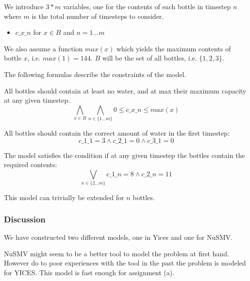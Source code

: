 \documentclass[12pt]{article}
\begin{document}
We introduce $3*m$ variables, one for the contents of each bottle in timestep 
$n$ where $m$ is the total number of timesteps to consider.

\begin{itemize}
\item $c\_x\_n$ for $x \in B$ and $n = 1 \ldots m$
\end{itemize}

We also assume a function $max(x)$ which yields the maximum contents of bottle
$x$, i.e. $max(1) = 144$. $B$ will be the set of all bottles, i.e. $\{1,2,3\}$.

The following formulas describe the constraints of the model.

\vspace{3mm}

All bottles should contain at least no water, and at max their maximum capacity
at any given timestep.
\begin{equation}
	\bigwedge_{x \in B} \bigwedge_{n \in \{1\ldots m\}} 
							0 \leq c\_x\_n \leq max(x)
\end{equation}
 
\vspace{3mm}

All bottles should contain the correct amount of water in the first timestep:
\begin{equation}
	c\_1\_1 = 3 \wedge c\_2\_1 = 0 \wedge c\_3\_1 = 0
\end{equation}

\vspace{3mm}

The model satisfies the condition if at any given timestep the bottles contain
the required contents:
\begin{equation}
	\bigvee_{n \in \{2\ldots m\}} c\_1\_n = 8 \wedge c\_2\_n = 11
\end{equation}

This model can trivially be extended for $n$ bottles. 

\subsubsection*{Discussion}
We have constructed two different models, one in Yices and one for NuSMV. 

NuSMV might seem to be a better tool to model the problem at first hand. However
do to poor experiences with the tool in the past the problem is modeled for 
YICES. This model is fast enough for assignment (a).
\end{document}
